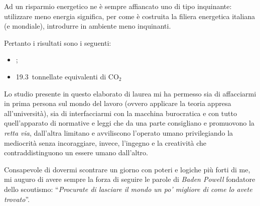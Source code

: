 Ad un risparmio energetico ne è sempre affiancato uno di tipo inquinante: utilizzare meno energia significa, per come è costruita la filiera energetica italiana (e mondiale), introdurre in ambiente meno inquinanti.

Pertanto i risultati sono i seguenti:
\begin{itemize}
	\item {}; %
	\item \num{19.3}\ tonnellate equivalenti di $\mathrm{CO_2}$ %
\end{itemize}

Lo studio presente in questo elaborato di laurea mi ha permesso sia di affacciarmi in prima persona sul mondo del lavoro (ovvero applicare la teoria appresa all'università), sia di interfacciarmi con la macchina burocratica e con tutto quell'apparato di normative e leggi che da una parte consigliano e promuovono la \emph{retta via}, dall'altra limitano e avviliscono l'operato umano privilegiando la mediocrità senza incoraggiare, invece, l'ingegno e la creatività che contraddistinguono un essere umano dall'altro.

Consapevole di dovermi scontrare un giorno con poteri e logiche più forti di me, mi auguro di avere sempre la forza di seguire le parole di \emph{Baden Powell} fondatore dello scoutismo: ``\emph{Procurate di lasciare il mondo un po' migliore di come lo avete trovato}''.